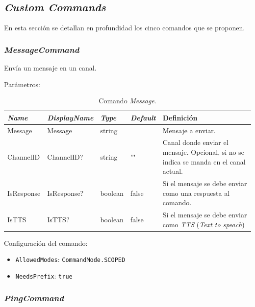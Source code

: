 \subsection{\textit{Custom Commands}}

En esta sección se detallan en profundidad los cinco comandos que se proponen.

\subsubsection{\textit{MessageCommand}}

Envía un mensaje en un canal.

Parámetros:

\begin{table}[H]
    \centering
    \def\arraystretch{1.25}
    \begin{adjustbox}{max width=\textwidth}
    \begin{tabularx}{\textwidth}{|l|l|l|l|L|}
    \hline
        \textbf{\textit{Name}} & \textbf{\textit{DisplayName}} & \textbf{\textit{Type}} & \textbf{\textit{Default}} & \textbf{Definición} \\ \hline
    \hline
        Message & Message & string & ~ & Mensaje a enviar. \\ \hline
        ChannelID & ChannelID? & string & "" & Canal donde enviar el mensaje. Opcional, si no se indica se manda en el canal actual. \\ \hline
        IsResponse & IsResponse? & boolean & false & Si el mensaje se debe enviar como una respuesta al comando. \\ \hline
        IsTTS & IsTTS? & boolean & false & Si el mensaje se debe enviar como \textit{TTS} (\textit{Text to speach}) \\ \hline
    \end{tabularx}
    \end{adjustbox}
    \caption{Comando \textit{Message}.}
\end{table}

Configuración del comando:

\begin{itemize}
	\item \verb|AllowedModes|: \verb|CommandMode.SCOPED|
	\item \verb|NeedsPrefix|: \verb|true|
\end{itemize}


\subsubsection{\textit{PingCommand}}

